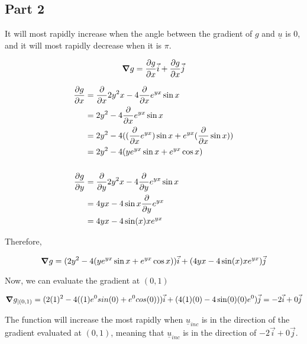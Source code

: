 \documentclass[12pt]{article} %
\begin{document}
\begin{homeworkProblem}
    \subsection*{Part 2}

    It will most rapidly increase when the angle between the gradient of $g$ and $\underline{u}$ is $0$, and it will most rapidly decrease when it is $\pi$.

    $$
        \gradient g = \pderiv{g}{x} \vec{i} + \pderiv{g}{x} \vec{j}
    $$

    \begin{align*}
        \frac{\partial g}{\partial x}
         & = \frac{\partial}{\partial x} 2 y^2 x - 4 \frac{\partial}{\partial x} e^{yx} \sin{x}                       \\
         & = 2 y^2 - 4 \frac{\partial}{\partial x} e^{yx} \sin{x}                                      \\
         & = 2 y^2 - 4 ((\frac{\partial}{\partial x} e^{yx}) \sin{x} + e^{yx} (\frac{\partial}{\partial x} \sin{x}) ) \\
         & = 2 y^2 - 4 (ye^{yx}  \sin{x} + e^{yx} \cos{x} )                             \\ \\
        \frac{\partial g}{\partial y}
         & = \frac{\partial}{\partial y} 2 y^2 x - 4 \frac{\partial}{\partial y} e^{yx} \sin{x}                       \\
         & = 4yx - 4\sin{x} \frac{\partial}{\partial y} e^{yx}                                         \\
         & = 4yx - 4\sin(x) x e^{yx}                                                    \\
    \end{align*}

    Therefore,

    $$
        \gradient g = (2 y^2 - 4 (ye^{yx}  \sin{x} + e^{yx} \cos{x})) \vec{i} + (4yx - 4\sin(x) x e^{yx}) \vec{j}
    $$

    Now, we can evaluate the gradient at $(0, 1)$

    $$
        \gradient g_{\mid (0, 1)} = (2(1)^2 - 4((1)e^0 sin(0) + e^0 cos(0))) \vec{i} + (4(1)(0) - 4 \sin(0) (0) e^{0}) \vec{j} = -2 \vec{i} + 0 \vec{j}
    $$

    The function will increase the most rapidly when $\underline{u}_{inc}$ is in the direction of the gradient evaluated at $(0, 1)$, meaning that $\underline{u}_{inc}$ is in the direction of $-2\vec{i} + 0 \vec{j}$.


\end{homeworkProblem}
\end{document}
